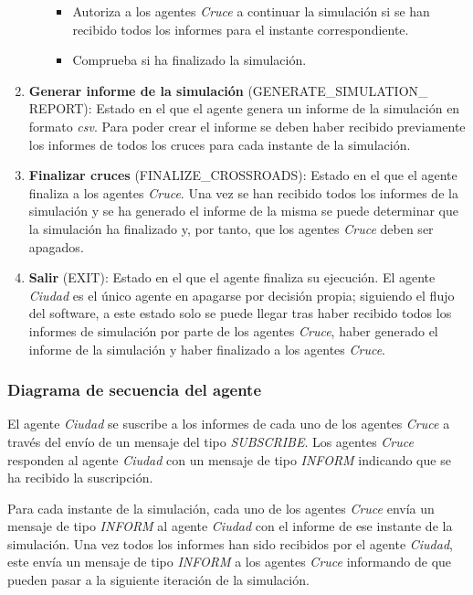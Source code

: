 \begin{enumerate}
\begin{itemize}
\begin{itemize}
                \item Autoriza a los agentes \textit{Cruce} a continuar la simulación si se han recibido todos los informes para el instante correspondiente.
                \item Comprueba si ha finalizado la simulación.
            \end{itemize}
    \end{itemize}
    \item \textbf{Generar informe de la simulación} \footnotesize(GENERATE\_SIMULATION\_ \newline REPORT)\normalsize: Estado en el que el agente genera un informe de la simulación en formato \textit{\acrshort{csv}}. Para poder crear el informe se deben haber recibido previamente los informes de todos los cruces para cada instante de la simulación.
    \item \textbf{Finalizar cruces} \footnotesize(FINALIZE\_CROSSROADS)\normalsize: Estado en el que el agente finaliza a los agentes \textit{Cruce}. Una vez se han recibido todos los informes de la simulación y se ha generado el informe de la misma se puede determinar que la simulación ha finalizado y, por tanto, que los agentes \textit{Cruce} deben ser apagados.
    \item \textbf{Salir} \footnotesize(EXIT)\normalsize: Estado en el que el agente finaliza su ejecución. El agente \textit{Ciudad} es el único agente en apagarse por decisión propia; siguiendo el flujo del software, a este estado solo se puede llegar tras haber recibido todos los informes de simulación por parte de los agentes \textit{Cruce}, haber generado el informe de la simulación y haber finalizado a los agentes \textit{Cruce}.
\end{enumerate}

\subsubsection{Diagrama de secuencia del agente}
El agente \textit{Ciudad} se suscribe a los informes de cada uno de los agentes \textit{Cruce} a través del envío de un mensaje del tipo \textit{SUBSCRIBE}. Los agentes \textit{Cruce} responden al agente \textit{Ciudad} con un mensaje de tipo \textit{INFORM} indicando que se ha recibido la suscripción.

Para cada instante de la simulación, cada uno de los agentes \textit{Cruce} envía un mensaje de tipo \textit{INFORM} al agente \textit{Ciudad} con el informe de ese instante de la simulación. Una vez todos los informes han sido recibidos por el agente \textit{Ciudad}, este envía un mensaje de tipo \textit{INFORM} a los agentes \textit{Cruce} informando de que pueden pasar a la siguiente iteración de la simulación.

